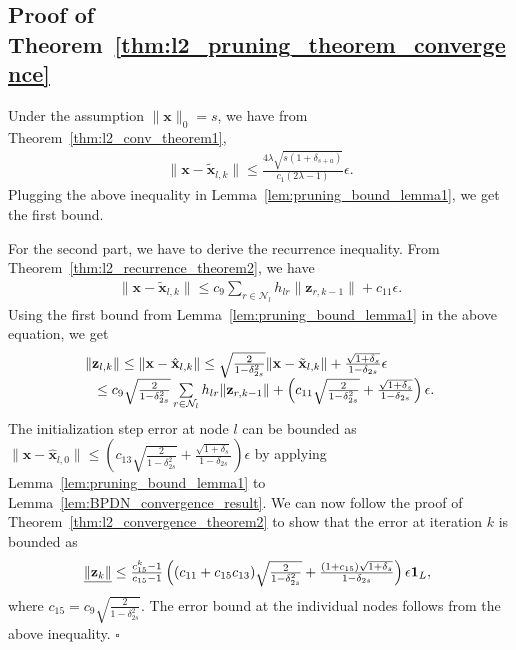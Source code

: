 \documentclass[journal]{IEEEtran}
\newcommand{\mbx}{\mathbf{x}}
\newcommand{\mbz}{\mathbf{z}}
\newcommand*{\QEDB}{\hfill\ensuremath{\square}}%
\begin{document}
\subsection{Proof of Theorem~\ref{thm:l2_pruning_theorem_convergence}}
Under the assumption $\|\mbx\|_0 = s$, we have from Theorem~\ref{thm:l2_conv_theorem1},
\begin{eqnarray*}
\|\mbx-\tilde{\mbx}_{l,k}\| \leq \frac{4\lambda \sqrt{s(1+\delta_{s+a})}}{c_1(2\lambda -1)} \epsilon .
\end{eqnarray*}
Plugging the above inequality in Lemma~\ref{lem:pruning_bound_lemma1}, we get the first bound.

For the second part, we have to derive the recurrence inequality. From Theorem~\ref{thm:l2_recurrence_theorem2}, we have
\begin{eqnarray*}
\|\mbx-\tilde{\mbx}_{l,k}\| \leq c_9 \sum\limits_{r \in \mathcal{N}_l} h_{lr} \|\mbz_{r,k-1}\| + c_{11} \epsilon.
\end{eqnarray*}
Using the first bound from Lemma~\ref{lem:pruning_bound_lemma1} in the above equation, we get
\begin{eqnarray*}
\begin{array}{l}
\|\mbz_{l,k}\|  \leq \|\mbx-\hat{\mbx}_{l,k}\| \leq \sqrt{\frac{2}{1-\delta_{2s}^2}}\|\mbx-\tilde{\mbx}_{l,k}\| + \frac{\sqrt{1+\delta_{s}}}{1-\delta_{2s}}\epsilon \\
 \hspace{3mm} \leq c_9\sqrt{\frac{2}{1-\delta_{2s}^2}}\sum\limits_{r \in \mathcal{N}_l} h_{lr} \|\mbz_{r,k-1}\| + \left(c_{11} \sqrt{\frac{2}{1-\delta_{2s}^2}} + \frac{\sqrt{1+\delta_{s}}}{1-\delta_{2s}}\right)\epsilon.
\end{array}
\end{eqnarray*}
The initialization step error at node $l$ can be bounded as $\|\mbx-\hat{\mbx}_{l,0}\| \leq \left(c_{13} \sqrt{\frac{2}{1-\delta_{2s}^2}} + \frac{\sqrt{1+\delta_{s}}}{1-\delta_{2s}}\right) \epsilon$ by applying Lemma~\ref{lem:pruning_bound_lemma1} to Lemma~\ref{lem:BPDN_convergence_result}.
We can now follow the proof of Theorem~\ref{thm:l2_convergence_theorem2} to show that the error at iteration $k$ is bounded as
\begin{eqnarray*}
\begin{array}{l}
\hspace{-1mm}\underline{\|\mbz_k\|} \leq \frac{c_{15}^k-1}{c_{15}-1}\left((c_{11}+c_{15}c_{13}) \sqrt{\frac{2}{1-\delta_{2s}^2}} + \frac{(1+c_{15})\sqrt{1+\delta_{s}}}{1-\delta_{2s}}\right) \epsilon \mathbf{1}_L,
\end{array}
\end{eqnarray*}
where $c_{15} = c_9\sqrt{\frac{2}{1-\delta_{2s}^2}}$. The error bound at the individual nodes follows from the above inequality.  \QEDB
\end{document}
